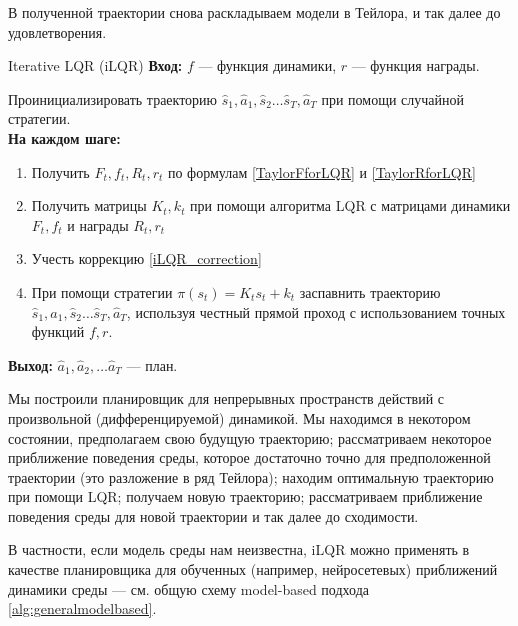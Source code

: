 В полученной траектории снова раскладываем модели в Тейлора, и так далее до удовлетворения.

\begin{algorithm}{Iterative LQR (iLQR)}
\textbf{Вход:} $f$ --- функция динамики, $r$ --- функция награды.

\vspace{0.3cm}
Проинициализировать траекторию $\hat{s}_1, \hat{a}_1, \hat{s}_2 \dots \hat{s}_T, \hat{a}_T$ при помощи случайной стратегии. \\ 
\textbf{На каждом шаге:}
\begin{enumerate}
    \item Получить $F_t, f_t, R_t, r_t$ по формулам \eqref{TaylorFforLQR} и \eqref{TaylorRforLQR}
    \item Получить матрицы $K_t, k_t$ при помощи алгоритма LQR с матрицами динамики $F_t, f_t$ и награды $R_t, r_t$
    \item Учесть коррекцию \eqref{iLQR_correction}
    \item При помощи стратегии $\pi(s_t) = K_t s_t + k_t$ заспавнить траекторию $\hat{s}_1, \hat{a}_1, \hat{s}_2 \dots \hat{s}_T, \hat{a}_T$, используя честный прямой проход с использованием точных функций $f, r$.
\end{enumerate}

\vspace{0.3cm}
\textbf{Выход:} $\hat{a}_1, \hat{a}_2, \dots \hat{a}_T$ --- план.
\end{algorithm}

Мы построили планировщик для непрерывных пространств действий с произвольной (дифференцируемой) динамикой. Мы находимся в некотором состоянии, предполагаем свою будущую траекторию; рассматриваем некоторое приближение поведения среды, которое достаточно точно для предположенной траектории (это разложение в ряд Тейлора); находим оптимальную траекторию при помощи LQR; получаем новую траекторию; рассматриваем приближение поведения среды для новой траектории и так далее до сходимости.

В частности, если модель среды нам неизвестна, iLQR можно применять в качестве планировщика для обученных (например, нейросетевых) приближений динамики среды --- см. общую схему model-based подхода \ref{alg:generalmodelbased}.
